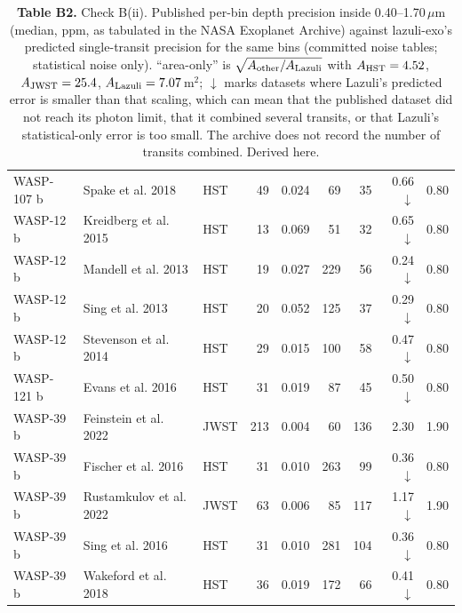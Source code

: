 \begin{table}[H]
\begin{tabular}{@{}lllrrrrrr@{}}
WASP-107 b & Spake et al. 2018 & HST & 49 & 0.024 & 69 & 35 & 0.66$\downarrow$ & 0.80 \\
WASP-12 b & Kreidberg et al. 2015 & HST & 13 & 0.069 & 51 & 32 & 0.65$\downarrow$ & 0.80 \\
WASP-12 b & Mandell et al. 2013 & HST & 19 & 0.027 & 229 & 56 & 0.24$\downarrow$ & 0.80 \\
WASP-12 b & Sing et al. 2013 & HST & 20 & 0.052 & 125 & 37 & 0.29$\downarrow$ & 0.80 \\
WASP-12 b & Stevenson et al. 2014 & HST & 29 & 0.015 & 100 & 58 & 0.47$\downarrow$ & 0.80 \\
WASP-121 b & Evans et al. 2016 & HST & 31 & 0.019 & 87 & 45 & 0.50$\downarrow$ & 0.80 \\
WASP-39 b & Feinstein et al. 2022 & JWST & 213 & 0.004 & 60 & 136 & 2.30 & 1.90 \\
WASP-39 b & Fischer et al. 2016 & HST & 31 & 0.010 & 263 & 99 & 0.36$\downarrow$ & 0.80 \\
WASP-39 b & Rustamkulov et al. 2022 & JWST & 63 & 0.006 & 85 & 117 & 1.17$\downarrow$ & 1.90 \\
WASP-39 b & Sing et al. 2016 & HST & 31 & 0.010 & 281 & 104 & 0.36$\downarrow$ & 0.80 \\
WASP-39 b & Wakeford et al. 2018 & HST & 36 & 0.019 & 172 & 66 & 0.41$\downarrow$ & 0.80 \\
\bottomrule
\end{tabular}
\caption*{\footnotesize\textbf{Table B2.} Check B(ii). Published per-bin depth precision inside 0.40--1.70\,$\mu$m (median, ppm, as tabulated in the NASA Exoplanet Archive) against lazuli-exo's predicted single-transit precision for the same bins (committed noise tables; statistical noise only). ``area-only'' is $\sqrt{A_{\rm other}/A_{\rm Lazuli}}$ with $A_{\rm HST}=4.52$, $A_{\rm JWST}=25.4$, $A_{\rm Lazuli}=7.07$\,m$^2$; $\downarrow$ marks datasets where Lazuli's predicted error is smaller than that scaling, which can mean that the published dataset did not reach its photon limit, that it combined several transits, or that Lazuli's statistical-only error is too small. The archive does not record the number of transits combined. Derived here.}
\end{table}
